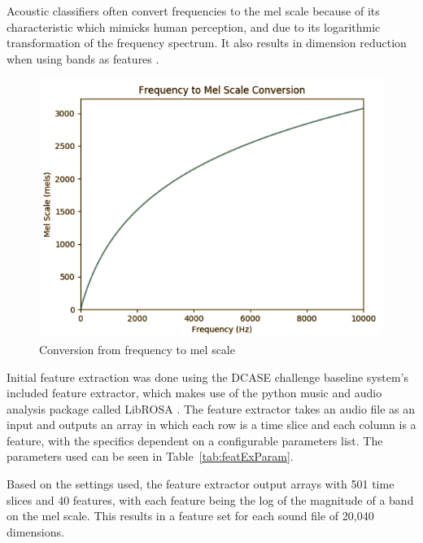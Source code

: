 \documentclass[11pt]{article}
\begin{document}
Acoustic classifiers often convert frequencies to the mel scale because of its characteristic which mimicks human perception, and due to its logarithmic transformation of the frequency spectrum. It also results in dimension reduction when using bands as features \cite{Stowell2014}.

\begin{figure}[!htbp]
	\centering
	\includegraphics[width=0.5\linewidth]{figures/hz2mel.png}
	\caption{Conversion from frequency to mel scale}
	\label{fig:hz2mel}
\end{figure}

Initial feature extraction was done using the DCASE challenge baseline system's included feature extractor, which makes use of the python music and audio analysis package called LibROSA \cite{Heittola2017}. The feature extractor takes an audio file as an input and outputs an array in which each row is a time slice and each column is a feature, with the specifics dependent on a configurable parameters list. The parameters used can be seen in Table~\ref{tab:featExParam}.

Based on the settings used, the feature extractor output arrays with 501 time slices and 40 features, with each feature being the log of the magnitude of a band on the mel scale. This results in a feature set for each sound file of 20,040 dimensions.
\end{document}
